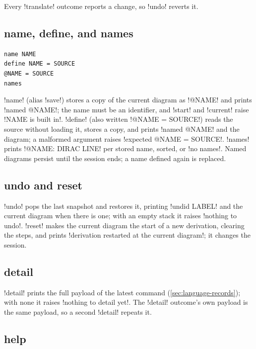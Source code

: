 Every \azx!translate! outcome reports a change, so \azx!undo! reverts it.

\subsection{name, define, and names}

\begin{lstlisting}[style=azx]
name NAME
define NAME = SOURCE
@NAME = SOURCE
names
\end{lstlisting}
\azx!name! (alias \code!save!) stores a copy of the current diagram as \code!@NAME! and prints \code!named @NAME!; the name must be an identifier, and \code!start! and \code!current! raise \code!NAME is built in!. \azx!define! (also written \code!@NAME = SOURCE!) reads the source without loading it, stores a copy, and prints \code!named @NAME! and the diagram; a malformed argument raises \code!expected @NAME = SOURCE!. \azx!names! prints \code!@NAME: DIRAC LINE! per stored name, sorted, or \code!no names!. Named diagrams persist until the session ends; a name defined again is replaced.

\subsection{undo and reset}

\azx!undo! pops the last snapshot and restores it, printing \code!undid LABEL! and the current diagram when there is one; with an empty stack it raises \code!nothing to undo!. \azx!reset! makes the current diagram the start of a new derivation, clearing the steps, and prints \code!derivation restarted at the current diagram!; it changes the session.

\subsection{detail}\label{sec:language-detail}

\azx!detail! prints the full payload of the latest command (\cref{sec:language-records}); with none it raises \code!nothing to detail yet!. The \azx!detail! outcome's own payload is the same payload, so a second \azx!detail! repeats it.

\subsection{help}

